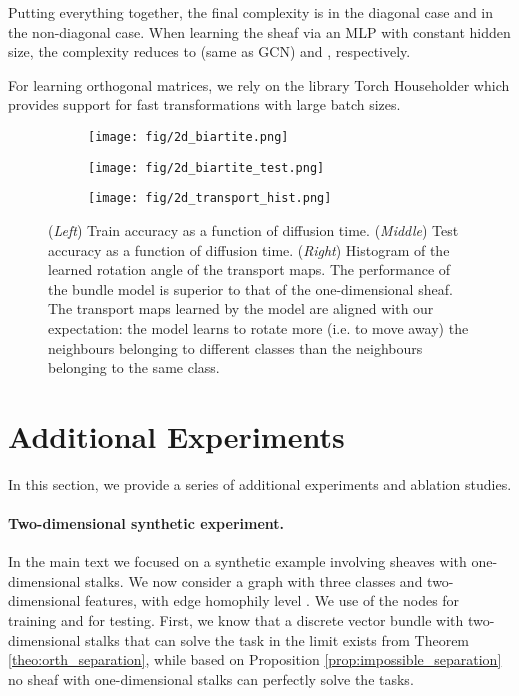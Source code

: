 \documentclass{article}
\begin{document}
Putting everything together, the final complexity is  in the diagonal case and  in the non-diagonal case. When learning the sheaf via an MLP with constant hidden size, the complexity reduces to  (same as GCN) and , respectively. 

For learning orthogonal matrices, we rely on the library Torch Householder \citep{obukhov2021torchhouseholder} which provides support for fast transformations with large batch sizes. 
\begin{figure*}[t]
    \begin{subfigure}[b]{0.32\columnwidth}
        \centering
        \texttt{[image: fig/2d\_biartite.png]}
    \end{subfigure}
    \hfill
    \begin{subfigure}[b]{0.32\columnwidth}
        \centering
        \texttt{[image: fig/2d\_biartite\_test.png]}
    \end{subfigure}
    \hfill
    \begin{subfigure}[b]{0.32\columnwidth}
        \centering
        \texttt{[image: fig/2d\_transport\_hist.png]}
    \end{subfigure}
    \caption{(\textit{Left}) Train accuracy as a function of diffusion time. (\textit{Middle}) Test accuracy as a function of diffusion time. (\textit{Right}) Histogram of the learned rotation angle of the  transport maps. The performance of the bundle model is superior to that of the one-dimensional sheaf. The transport maps learned by the model are aligned with our expectation: the model learns to rotate more (i.e. to move away) the neighbours belonging to different classes than the neighbours belonging to the same class. }
    \label{fig:3d_synthetic}
\end{figure*}

\section{Additional Experiments}\label{app:extra_experiments}

In this section, we provide a series of additional experiments and ablation studies. 


\paragraph{Two-dimensional synthetic experiment.} In the main text we focused on a synthetic example involving sheaves with one-dimensional stalks. We now consider a graph with three classes and two-dimensional features, with edge homophily level . We use  of the nodes for training and  for testing. First, we know that a discrete vector bundle with two-dimensional stalks that can solve the task in the limit exists from Theorem \ref{theo:orth_separation}, while based on Proposition \ref{prop:impossible_separation} no sheaf with one-dimensional stalks can perfectly solve the tasks. 
\end{document}
